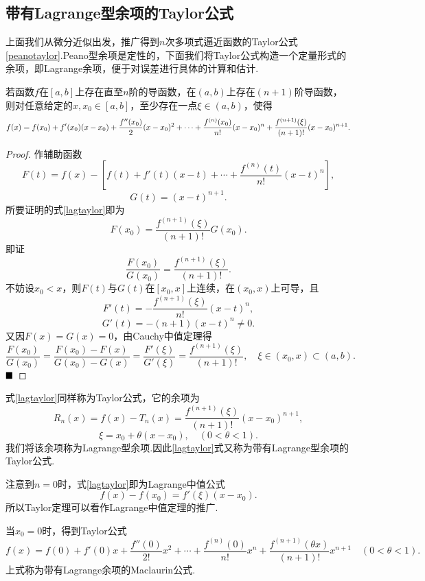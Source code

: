 \subsection{带有Lagrange型余项的Taylor公式}
上面我们从微分近似出发，推广得到$n$次多项式逼近函数的Taylor公式\ref{peanotaylor}.Peano型余项是{\heiti 定性}的，下面我们将Taylor公式构造一个{\heiti 定量}形式的余项，即Lagrange余项，便于对误差进行具体的计算和估计.
\begin{theorem}[Taylor定理]
	若函数$f$在$\left[a,b\right]$上存在直至$n$阶的导函数，在$(a,b)$上存在$(n+1)$阶导函数，则对任意给定的$x,x_0\in\left[a,b\right]$，至少存在一点$\xi\in(a,b)$，使得
	\begin{equation}{\label{lagtaylor}}
		f(x)=f(x_0)+f'(x_0)(x-x_0)+\frac{f''(x_0)}{2}(x-x_0)^2+\cdots+\frac{f^{(n)}(x_0)}{n!}(x-x_0)^n+\frac{f^{(n+1)}(\xi)}{(n+1)!}(x-x_0)^{n+1}.
	\end{equation}
\end{theorem}
\begin{proof}
	作辅助函数
	$$F(t)=f(x)-\left[f(t)+f'(t)(x-t)+\cdots+\frac{f^{(n)}(t)}{n!}(x-t)^n\right],$$
	$$G(t)=(x-t)^{n+1}.$$
	所要证明的式\ref{lagtaylor}即为
	$$F(x_0)=\frac{f^{(n+1)}(\xi)}{(n+1)!}G(x_0).$$
	即证$$\frac{F(x_0)}{G(x_0)}=\frac{f^{(n+1)}(\xi)}{(n+1)!}.$$
	不妨设$x_0<x$，则$F(t)$与$G(t)$在$\left[x_0,x\right]$上连续，在$(x_0,x)$上可导，且
	$$F'(t)=-\frac{f^{(n+1)}(\xi)}{n!}(x-t)^n,$$
	$$G'(t)=-(n+1)(x-t)^n\neq 0.$$
	又因$F(x)=G(x)=0$，由Cauchy中值定理得
	$$\frac{F(x_0)}{G(x_0)}=\frac{F(x_0)-F(x)}{G(x_0)-G(x)}=\frac{F'(\xi)}{G'(\xi)}=\frac{f^{(n+1)}(\xi)}{(n+1)!},\quad \xi\in(x_0,x)\subset(a,b).$$
	$\hfill\blacksquare$
\end{proof}

式\ref{lagtaylor}同样称为{\heiti Taylor公式}，它的余项为
$$R_n(x)=f(x)-T_n(x)=\frac{f^{(n+1)}(\xi)}{(n+1)!}(x-x_0)^{n+1},$$
$$\xi=x_0+\theta(x-x_0),\quad (0<\theta<1).$$
我们将该余项称为{\heiti Lagrange型余项}.因此\ref{lagtaylor}式又称为{\heiti 带有Lagrange型余项的Taylor公式}.

注意到$n=0$时，式\ref{lagtaylor}即为Lagrange中值公式
$$f(x)-f(x_0)=f'(\xi)(x-x_0).$$
所以Taylor定理可以看作Lagrange中值定理的推广.

当$x_0=0$时，得到Taylor公式
$$f(x)=f(0)+f'(0)x+\frac{f''(0)}{2!}x^2+\cdots+\frac{f^{(n)}(0)}{n!}x^n+\frac{f^{(n+1)}(\theta x)}{(n+1)!}x^{n+1}\quad (0<\theta<1).$$
上式称为带有Lagrange余项的Maclaurin公式.

